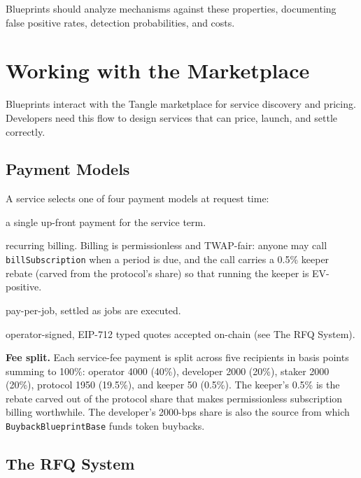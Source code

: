 \documentclass[11pt,a4paper]{article}
\begin{document}
Blueprints should analyze mechanisms against these properties, documenting false positive rates, detection probabilities, and costs.

\section{Working with the Marketplace}

Blueprints interact with the Tangle marketplace for service discovery and pricing. Developers need this flow to design services that can price, launch, and settle correctly.

\subsection{Payment Models}

A service selects one of four payment models at request time:

\begin{description}[noitemsep]
    \item[PayOnce] a single up-front payment for the service term.
    \item[Subscription] recurring billing. Billing is permissionless and TWAP-fair: anyone may call \texttt{billSubscription} when a period is due, and the call carries a 0.5\% keeper rebate (carved from the protocol's share) so that running the keeper is EV-positive.
    \item[EventDriven] pay-per-job, settled as jobs are executed.
    \item[RFQ quotes] operator-signed, EIP-712 typed quotes accepted on-chain (see The RFQ System).
\end{description}

\textbf{Fee split.} Each service-fee payment is split across five recipients in basis points summing to 100\%: operator 4000 (40\%), developer 2000 (20\%), staker 2000 (20\%), protocol 1950 (19.5\%), and keeper 50 (0.5\%). The keeper's 0.5\% is the rebate carved out of the protocol share that makes permissionless subscription billing worthwhile. The developer's 2000-bps share is also the source from which \texttt{BuybackBlueprintBase} funds token buybacks.

\subsection{The RFQ System}
\end{document}
